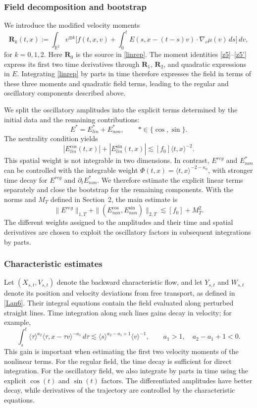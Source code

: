 \documentclass[reqno,11pt]{amsart}
\numberwithin{equation}{section}
\def\R{{\mathbb R}}
\def\R{{\bf R}}
\def\R{\mathbb{R}}
\begin{document}
\subsubsection{Field decomposition and bootstrap}\label{intro-field}
We introduce the modified velocity moments
\[
\mathbf R_k(t,x):=\int_{\R^2}v^{\otimes k}
\Big[f(t,x,v)+\int_0^t
E(s,x-(t-s)v)\cdot\nabla_v\mu(v)\,ds\Big]\,dv,
\]
for $k=0,1,2$. Here $\mathbf R_0$ is the source in \eqref{linrep}.
The moment identities \eqref{z5}--\eqref{z5'} express its first two
time derivatives through $\mathbf R_1$, $\mathbf R_2$, and quadratic
expressions in $E$. Integrating \eqref{linrep} by parts in time
therefore expresses the field in terms of these three moments and
quadratic field terms, leading to the regular and oscillatory
components described above.

We split the oscillatory amplitudes into the explicit terms determined
by the initial data and the remaining contributions:
\[
E^\ast=E^\ast_{lin}+E^\ast_{non},\qquad \ast\in\{\cos,\sin\}.
\]
The neutrality condition yields
\[
|E^{\cos}_{lin}(t,x)|+|E^{\sin}_{lin}(t,x)|
\lesssim[f_0]\langle t,x\rangle^{-2}.
\]
This spatial weight is not integrable in two dimensions. In contrast,
$E^{reg}$ and $E^\ast_{non}$ can be controlled with the integrable
weight $\Phi(t,x)=\langle t,x\rangle^{-2-\kappa_0}$, with stronger
time decay for $E^{reg}$ and $\partial_tE^\ast_{non}$. We therefore
estimate the explicit linear terms separately and close the
bootstrap for the remaining components. With the norms and $M_T$
defined in Section~2, the main estimate is
\[
\|E^{reg}\|_{1,T}
+\|(E^{\cos}_{non},E^{\sin}_{non})\|_{2,T}
\lesssim[f_0]+M_T^2.
\]
The different weights assigned to the amplitudes and their time and
spatial derivatives are chosen to exploit the oscillatory factors in
subsequent integrations by parts.

\subsubsection{Characteristic estimates}
Let $(X_{s,t},V_{s,t})$ denote the backward characteristic flow, and let
$Y_{s,t}$ and $W_{s,t}$ denote its position and velocity deviations
from free transport, as defined in \eqref{Lan6}. Their
integral equations contain the field evaluated along perturbed
straight lines. Time integration along such lines gains decay in
velocity; for example,
\begin{equation}\label{time-velocity-gain}
	\int_s^t\langle\tau\rangle^{a_2}
	\langle\tau,x-\tau v\rangle^{-a_1}\,d\tau
	\lesssim
	\langle s\rangle^{a_2-a_1+1}\langle v\rangle^{-1},
	\qquad a_1>1,\quad a_2-a_1+1<0.
\end{equation}
This gain is important when estimating the first two velocity
moments of the nonlinear terms. For the regular field, the time
decay is sufficient for direct integration. For the oscillatory
field, we also integrate by parts in time using the explicit
$\cos(t)$ and $\sin(t)$ factors. The differentiated amplitudes
have better decay, while derivatives of the trajectory are
controlled by the characteristic equations.
\end{document}
